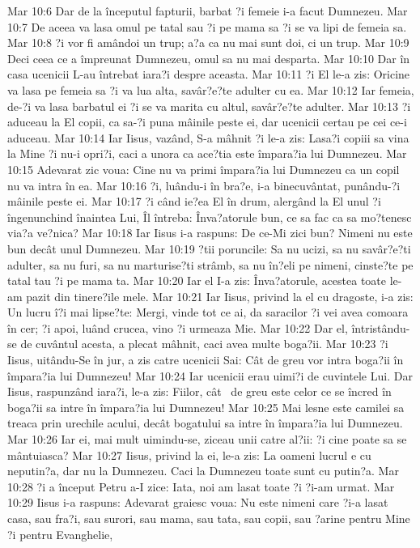 Mar 10:6  Dar de la începutul fapturii, barbat ?i femeie i-a facut Dumnezeu.
Mar 10:7  De aceea va lasa omul pe tatal sau ?i pe mama sa ?i se va lipi de femeia sa.
Mar 10:8  ?i vor fi amândoi un trup; a?a ca nu mai sunt doi, ci un trup.
Mar 10:9  Deci ceea ce a împreunat Dumnezeu, omul sa nu mai desparta.
Mar 10:10  Dar în casa ucenicii L-au întrebat iara?i despre aceasta.
Mar 10:11  ?i El le-a zis: Oricine va lasa pe femeia sa ?i va lua alta, savâr?e?te adulter cu ea.
Mar 10:12  Iar femeia, de-?i va lasa barbatul ei ?i se va marita cu altul, savâr?e?te adulter.
Mar 10:13  ?i aduceau la El copii, ca sa-?i puna mâinile peste ei, dar ucenicii certau pe cei ce-i aduceau.
Mar 10:14  Iar Iisus, vazând, S-a mâhnit ?i le-a zis: Lasa?i copiii sa vina la Mine ?i nu-i opri?i, caci a unora ca ace?tia este împara?ia lui Dumnezeu.
Mar 10:15  Adevarat zic voua: Cine nu va primi împara?ia lui Dumnezeu ca un copil nu va intra în ea.
Mar 10:16  ?i, luându-i în bra?e, i-a binecuvântat, punându-?i mâinile peste ei.
Mar 10:17  ?i când ie?ea El în drum, alergând la El unul ?i îngenunchind înaintea Lui, Îl întreba: Înva?atorule bun, ce sa fac ca sa mo?tenesc via?a ve?nica?
Mar 10:18  Iar Iisus i-a raspuns: De ce-Mi zici bun? Nimeni nu este bun decât unul Dumnezeu.
Mar 10:19  ?tii poruncile: Sa nu ucizi, sa nu savâr?e?ti adulter, sa nu furi, sa nu marturise?ti strâmb, sa nu în?eli pe nimeni, cinste?te pe tatal tau ?i pe mama ta.
Mar 10:20  Iar el I-a zis: Înva?atorule, acestea toate le-am pazit din tinere?ile mele.
Mar 10:21  Iar Iisus, privind la el cu dragoste, i-a zis: Un lucru î?i mai lipse?te: Mergi, vinde tot ce ai, da saracilor ?i vei avea comoara în cer; ?i apoi, luând crucea, vino ?i urmeaza Mie.
Mar 10:22  Dar el, întristându-se de cuvântul acesta, a plecat mâhnit, caci avea multe boga?ii.
Mar 10:23  ?i Iisus, uitându-Se în jur, a zis catre ucenicii Sai: Cât de greu vor intra boga?ii în împara?ia lui Dumnezeu!
Mar 10:24  Iar ucenicii erau uimi?i de cuvintele Lui. Dar Iisus, raspunzând iara?i, le-a zis: Fiilor, cât  de greu este celor ce se încred în boga?ii sa intre în împara?ia lui Dumnezeu!
Mar 10:25  Mai lesne este camilei sa treaca prin urechile acului, decât bogatului sa intre în împara?ia lui Dumnezeu.
Mar 10:26  Iar ei, mai mult uimindu-se, ziceau unii catre al?ii: ?i cine poate sa se mântuiasca?
Mar 10:27  Iisus, privind la ei, le-a zis: La oameni lucrul e cu neputin?a, dar nu la Dumnezeu. Caci la Dumnezeu toate sunt cu putin?a.
Mar 10:28  ?i a început Petru a-I zice: Iata, noi am lasat toate ?i ?i-am urmat.
Mar 10:29  Iisus i-a raspuns: Adevarat graiesc voua: Nu este nimeni care ?i-a lasat casa, sau fra?i, sau surori, sau mama, sau tata, sau copii, sau ?arine pentru Mine ?i pentru Evanghelie,
